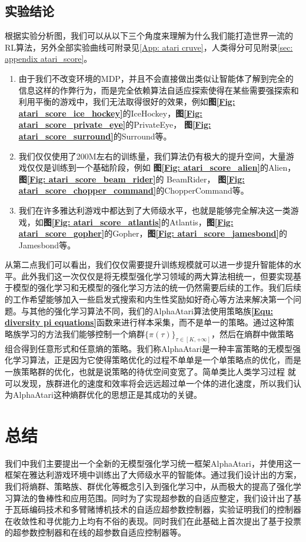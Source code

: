 \section{实验结论}
根据实验分析图，我们可以从以下三个角度来理解为什么我们能打造世界一流的RL算法，另外全部实验曲线可附录见\ref{App: atari cruve}，人类得分可见附录\ref{sec: appendix atari_score}。
\begin{enumerate}
    \item 由于我们不改变环境的MDP，并且不会直接做出类似让智能体了解到完全的信息这样的作弊行为，而是完全依赖算法自适应探索使得在某些需要强探索和利用平衡的游戏中，我们无法取得很好的效果，例如\textbf{图\ref{Fig: atari_score_ice_hockey}}的IceHockey，\textbf{图\ref{Fig: atari_score_private_eye}}的PrivateEye， \textbf{图\ref{Fig: atari_score_surround}}的Surround等。
    \item 我们仅仅使用了200M左右的训练量，我们算法仍有极大的提升空间，大量游戏仅仅是训练到一个基础阶段，例如 \textbf{图\ref{Fig: atari_score_alien}}的Alien，\textbf{图\ref{Fig: atari_score_beam_rider}}的 BeamRider， \textbf{图\ref{Fig: atari_score_chopper_command}}的ChopperCommand等。
    \item 我们在许多雅达利游戏中都达到了大师级水平，也就是能够完全解决这一类游戏，如\textbf{图\ref{Fig: atari_score_atlantis}}的Atlantis，\textbf{图\ref{Fig: atari_score_gopher}}的Gopher，\textbf{图\ref{Fig: atari_score_jamesbond}}的Jamesbond等。
\end{enumerate}
从第二点我们可以看出，我们仅仅需要提升训练规模就可以进一步提升智能体的水平。此外我们这一次仅仅是将无模型强化学习领域的两大算法相统一，但要实现基于模型的强化学习和无模型的强化学习方法的统一仍然需要后续的工作。我们后续的工作希望能够加入一些启发式搜索和内生性奖励如好奇心等方法来解决第一个问题。与其他的强化学习算法不同，我们的AlphaAtari算法使用策略族\textbf{\eqref{Equ: diversity pi equations}}函数来进行样本采集，而不是单一的策略。通过这种策略族学习的方法我们能够控制一个熵群$\{\pi(\tau)\}_{\tau \in[K,+\infty]}$，然后在熵群中做策略组合得到任意形式和任意熵的策略。我们称AlphaAtari是一种丰富策略的无模型强化学习算法，正是因为它使得策略优化的过程不单单是一个单策略点的优化，而是一族策略群的优化，也就是说策略的待优空间变宽了。简单类比人类学习过程
就可以发现，族群进化的速度和效率将会远远超过单一个体的进化速度，所以我们认为AlphaAtari这种熵群优化的思想正是其成功的关键。
\chapter{总结}
\label{Chpt: conclusion}
我们中我们主要提出一个全新的无模型强化学习统一框架AlphaAtari，并使用这一框架在雅达利游戏环境中训练出了大师级水平的智能体。通过我们设计出的方案，我们将熵群、策略族、群优化等概念引入到强化学习中，从而极大的提高了强化学习算法的鲁棒性和应用范围。同时为了实现超参数的自适应整定，我们设计出了基于瓦砾编码技术和多臂赌博机技术的自适应超参数控制器，实验证明我们的控制器在收敛性和寻优能力上均有不俗的表现。同时我们在此基础上首次提出了基于投票的超参数控制器和在线的超参数自适应控制器等。

